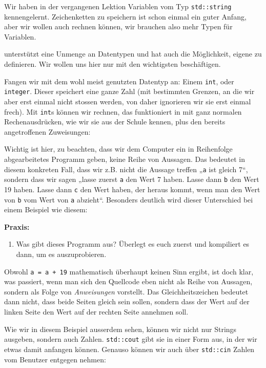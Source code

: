 
Wir haben in der vergangenen Lektion Variablen vom Typ \texttt{std::string}
kennengelernt. Zeichenketten zu speichern ist schon einmal ein guter Anfang,
aber wir wollen auch rechnen können, wir brauchen also mehr Typen für
Variablen.

\Cpp unterstützt eine Unmenge an Datentypen und hat auch die Möglichkeit,
eigene zu definieren. Wir wollen uns hier nur mit den wichtigsten beschäftigen.

Fangen wir mit dem wohl meist genutzten Datentyp an: Einem \texttt{int}, oder
\texttt{integer}. Dieser speichert eine ganze Zahl (mit bestimmten Grenzen, an
die wir aber erst einmal nicht stossen werden, von daher ignorieren wir sie
erst einmal frech). Mit \texttt{int}s können wir rechnen, das funktioniert in
\Cpp mit ganz normalen Rechenausdrücken, wie wir sie aus der Schule kennen,
plus den bereits angetroffenen Zuweisungen:


Wichtig ist hier, zu beachten, dass wir dem Computer ein in Reihenfolge
abgearbeitetes Programm geben, keine Reihe von Aussagen. Das bedeutet in diesem
konkreten Fall, dass wir z.B. nicht die Aussage treffen „\texttt{a} ist gleich
7“, sondern dass wir sagen „lasse zuerst \texttt{a} den Wert 7 haben. Lasse
dann \texttt{b} den Wert 19 haben. Lasse dann \texttt{c} den Wert haben, der
heraus kommt, wenn man den Wert von \texttt{b} vom Wert von \texttt{a}
abzieht“. Besonders deutlich wird dieser Unterschied bei einem Beispiel wie
diesem:


\textbf{Praxis:}
\begin{enumerate}
    \item Was gibt dieses Programm aus? Überlegt es euch zuerst und kompiliert
        es dann, um es auszuprobieren.
\end{enumerate}

Obwohl \texttt{a = a + 19} mathematisch überhaupt keinen Sinn ergibt, ist doch
klar, was passiert, wenn man sich den Quellcode eben nicht als Reihe von
Aussagen, sondern als Folge von \emph{Anweisungen} vorstellt. Das
Gleichheitszeichen bedeutet dann nicht, dass beide Seiten gleich sein sollen,
sondern dass der Wert auf der linken Seite den Wert auf der rechten Seite
annehmen soll.

Wie wir in diesem Beispiel ausserdem sehen, können wir nicht nur Strings
ausgeben, sondern auch Zahlen. \texttt{std::cout} gibt sie in einer Form aus,
in der wir etwas damit anfangen können. Genauso können wir auch über
\texttt{std::cin} Zahlen vom Benutzer entgegen nehmen:

